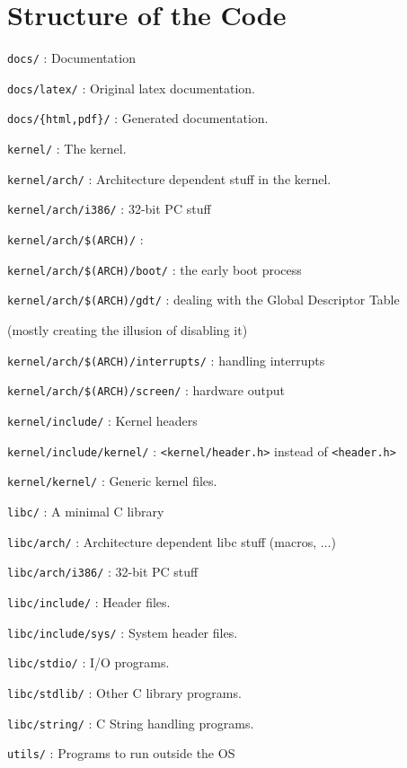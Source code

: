 \documentclass[12pt]{article}
\newcommand{\code}[1]{\colorbox{light-gray}{\texttt{#1}}}
\begin{document}
\section{Structure of the Code}
\begin{list}{}{}
\item \code{docs/} : Documentation
\item \code{docs/latex/} : Original latex documentation.
\item \code{docs/\{html,pdf\}/} : Generated documentation.
\item \code{kernel/} : The kernel.
\item \code{kernel/arch/} : Architecture dependent stuff in the kernel.
\item \code{kernel/arch/i386/} : 32-bit PC stuff
\item \code{kernel/arch/\$(ARCH)/} :
\item \code{kernel/arch/\$(ARCH)/boot/} : the early boot process
\item \code{kernel/arch/\$(ARCH)/gdt/} : dealing with the Global Descriptor Table \begin{small}(mostly creating the illusion of disabling it)\end{small}
\item \code{kernel/arch/\$(ARCH)/interrupts/} : handling interrupts
\item \code{kernel/arch/\$(ARCH)/screen/} : hardware output
\item \code{kernel/include/} : Kernel headers
\item \code{kernel/include/kernel/} : \code{<kernel/header.h>} instead of \code{<header.h>}
\item \code{kernel/kernel/} : Generic kernel files.
\item \code{libc/} : A minimal C library
\item \code{libc/arch/} : Architecture dependent libc stuff (macros, ...)
\item \code{libc/arch/i386/} : 32-bit PC stuff
\item \code{libc/include/} : Header files.
\item \code{libc/include/sys/} : System header files.
\item \code{libc/stdio/} : I/O programs.
\item \code{libc/stdlib/} : Other C library programs.
\item \code{libc/string/} : C String handling programs.
\item \code{utils/} : Programs to run outside the OS
\end{list}
\end{document}
